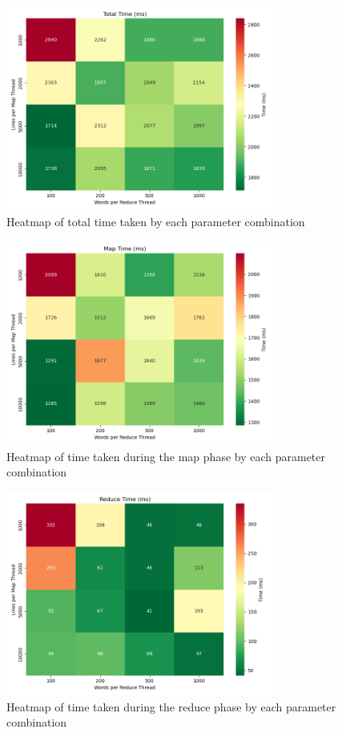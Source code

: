 \documentclass[a4paper]{article}
\begin{document}
\begin{figure}[H]
    \centering
    \includegraphics[width=0.8\textwidth]{./images/total_time_heatmap.png}
    \caption{Heatmap of total time taken by each parameter combination}
\end{figure}

\begin{figure}[H]
    \centering
    \includegraphics[width=0.8\textwidth]{./images/map_time_heatmap.png}
    \caption{Heatmap of time taken during the map phase by each parameter combination}
\end{figure}

\begin{figure}[H]
    \centering
    \includegraphics[width=0.8\textwidth]{./images/reduce_time_heatmap.png}
    \caption{Heatmap of time taken during the reduce phase by each parameter combination}
\end{figure}
\end{document}
